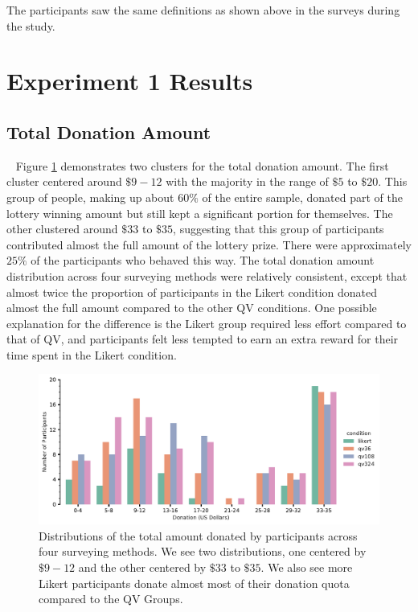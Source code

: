 The participants saw the same definitions as shown above in the surveys during the study.

\section{Experiment 1 Results}

\subsection{Total Donation Amount}~\label{total_donation}
Figure \ref{fig:total_don_exp1} demonstrates two clusters for the total donation amount. 
The first cluster centered around $\$9-12$ with the majority in the range of $\$5$ to $\$20$. This group of people, making up about $60\%$ of the entire sample, donated part of the lottery winning amount but still kept a significant portion for themselves. The other clustered around $\$33$ to $\$35$, suggesting that this group of participants
contributed almost the full amount of the lottery prize. There were approximately $25\%$ of the participants who behaved this way. The total donation amount distribution across four surveying methods were relatively consistent, except that almost twice the proportion of participants in the Likert condition donated almost the full amount compared to the other QV conditions. One possible explanation for the difference is 
the Likert group required less effort compared to that of QV, and participants felt less tempted to earn an extra reward for their time spent in the Likert condition. 


\begin{figure}[htpb]
    \centering
    \includegraphics[width=\textwidth, keepaspectratio=true]{content/image/total_contributions_across_conditions.pdf}
    \caption{
       Distributions of the total amount donated by participants across four surveying methods.
       We see two distributions, one centered by $\$9-12$ and the other centered by $\$33$ to $\$35$.
       We also see more Likert participants donate almost most of their donation quota compared to the QV Groups.
    }
    \label{fig:total_don_exp1}
\end{figure}

